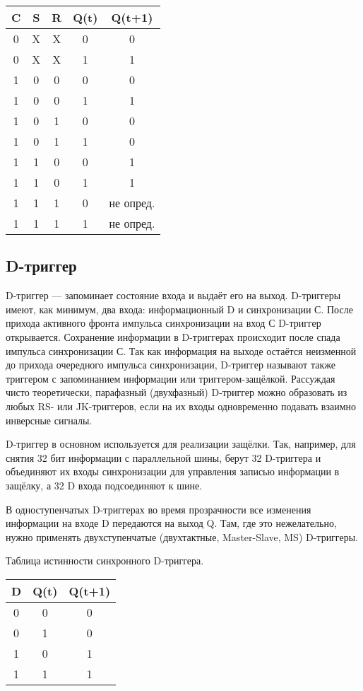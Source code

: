 \begin{tabular}{|c|c|c|c|c|}
\hline	C	& S	& R	& Q(t)	& Q(t+1)	\\
\hline	0	& X	& X	& 0		& 0			\\
\hline	0	& X	& X	& 1		& 1			\\
\hline	1	& 0	& 0	& 0		& 0			\\
\hline	1	& 0	& 0	& 1		& 1			\\
\hline	1	& 0	& 1	& 0		& 0			\\
\hline	1	& 0	& 1	& 1		& 0			\\
\hline	1	& 1	& 0	& 0		& 1			\\
\hline	1	& 1	& 0	& 1		& 1			\\
\hline	1	& 1	& 1	& 0		& не опред.	\\
\hline	1	& 1	& 1	& 1		& не опред.	\\
\hline
\end{tabular}

\subsection*{D-триггер}

D-триггер --- запоминает состояние входа и выдаёт его на выход. D-триггеры имеют, как минимум, два входа: информационный D и синхронизации С. После прихода активного фронта импульса синхронизации на вход С D-триггер открывается. Сохранение информации в D-триггерах происходит после спада импульса синхронизации С. Так как информация на выходе остаётся неизменной до прихода очередного импульса синхронизации, D-триггер называют также триггером с запоминанием информации или триггером-защёлкой. Рассуждая чисто теоретически, парафазный (двухфазный) D-триггер можно образовать из любых RS- или JK-триггеров, если на их входы одновременно подавать взаимно инверсные сигналы.

D-триггер в основном используется для реализации защёлки. Так, например, для снятия 32 бит информации с параллельной шины, берут 32 D-триггера и объединяют их входы синхронизации для управления записью информации в защёлку, а 32 D входа подсоединяют к шине.

В одноступенчатых D-триггерах во время прозрачности все изменения информации на входе D передаются на выход Q. Там, где это нежелательно, нужно применять двухступенчатые (двухтактные, Master-Slave, MS) D-триггеры.

Таблица истинности синхронного D-триггера.

\begin{tabular}{|c|c|c|}
\hline	D	& Q(t)	& Q(t+1)	\\
\hline	0	& 0		& 0			\\
\hline	0	& 1		& 0			\\
\hline	1	& 0		& 1			\\
\hline	1	& 1		& 1			\\
\hline
\end{tabular}

